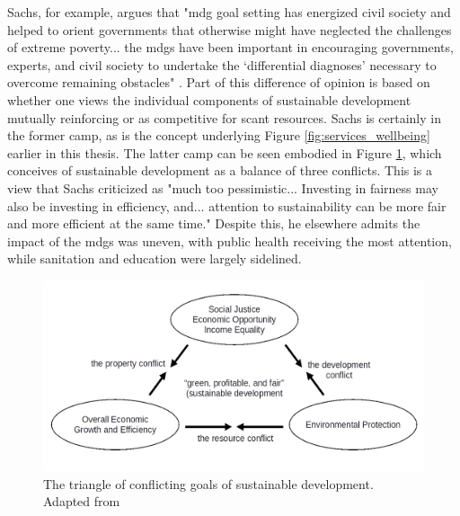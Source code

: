 Sachs, for example, argues that "\ac{mdg} goal setting has energized civil society and helped to orient governments that otherwise might have neglected the challenges of extreme poverty... the \acp{mdg} have been important in encouraging governments, experts, and civil society to undertake the `differential diagnoses' necessary to overcome remaining obstacles" \cite{sachsAgeSustainableDevelopment2015}. Part of this difference of opinion is based on whether one views the individual components of sustainable development mutually reinforcing or as competitive for scant resources. Sachs is certainly in the former camp, as is the concept underlying Figure \ref{fig:services_wellbeing} earlier in this thesis. The latter camp can be seen embodied in Figure \ref{fig:sustainable_triangle}, which conceives of sustainable development as a balance of three conflicts. This is a view that Sachs criticized as "much too pessimistic... Investing in fairness may also be investing in efficiency, and... attention to sustainability can be more fair and more efficient at the same time." Despite this, he elsewhere admits the impact of the \acp{mdg} was uneven, with public health receiving the most attention, while sanitation and education were largely sidelined. \cite{sachsAgeSustainableDevelopment2015}


\begin{figure}[!htb]
	\centering
	\includegraphics[scale=0.35]{Figures/chap2/sustainable_triangle.png}
	\caption[The triangle of conflicting goals of sustainable development]{The triangle of conflicting goals of sustainable development. Adapted from \cite{campbellGreenCitiesGrowing2016}}
	\label{fig:sustainable_triangle}
\end{figure}

